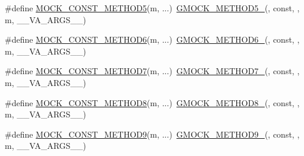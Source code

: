 \begin{DoxyCompactItemize}
\item 
\#define \mbox{\hyperlink{_obj__test_2lib_2googletest-release-1_88_81_2googlemock_2include_2gmock_2gmock-generated-function-mockers_8h_ab7021ec2b869e7c9ea90363ee675f19b}{M\+O\+C\+K\+\_\+\+C\+O\+N\+S\+T\+\_\+\+M\+E\+T\+H\+O\+D5}}(m, ...)~\mbox{\hyperlink{_obj__test_2lib_2googletest-release-1_88_81_2googlemock_2include_2gmock_2gmock-generated-function-mockers_8h_a9e3ecd392499ab19a4a6d3adcabf56f6}{G\+M\+O\+C\+K\+\_\+\+M\+E\+T\+H\+O\+D5\+\_\+}}(, const, , m, \+\_\+\+\_\+\+V\+A\+\_\+\+A\+R\+G\+S\+\_\+\+\_\+)
\item 
\#define \mbox{\hyperlink{_obj__test_2lib_2googletest-release-1_88_81_2googlemock_2include_2gmock_2gmock-generated-function-mockers_8h_a5081a185ba264d599357398952c23af1}{M\+O\+C\+K\+\_\+\+C\+O\+N\+S\+T\+\_\+\+M\+E\+T\+H\+O\+D6}}(m, ...)~\mbox{\hyperlink{_obj__test_2lib_2googletest-release-1_88_81_2googlemock_2include_2gmock_2gmock-generated-function-mockers_8h_ad0ca7f6973a076d0af4c953f8ed91842}{G\+M\+O\+C\+K\+\_\+\+M\+E\+T\+H\+O\+D6\+\_\+}}(, const, , m, \+\_\+\+\_\+\+V\+A\+\_\+\+A\+R\+G\+S\+\_\+\+\_\+)
\item 
\#define \mbox{\hyperlink{_obj__test_2lib_2googletest-release-1_88_81_2googlemock_2include_2gmock_2gmock-generated-function-mockers_8h_a0f0e63ed14beab1d85f0160bdbed9930}{M\+O\+C\+K\+\_\+\+C\+O\+N\+S\+T\+\_\+\+M\+E\+T\+H\+O\+D7}}(m, ...)~\mbox{\hyperlink{_obj__test_2lib_2googletest-release-1_88_81_2googlemock_2include_2gmock_2gmock-generated-function-mockers_8h_ab98a8399ba62b53b375c2807f4d39d2f}{G\+M\+O\+C\+K\+\_\+\+M\+E\+T\+H\+O\+D7\+\_\+}}(, const, , m, \+\_\+\+\_\+\+V\+A\+\_\+\+A\+R\+G\+S\+\_\+\+\_\+)
\item 
\#define \mbox{\hyperlink{_obj__test_2lib_2googletest-release-1_88_81_2googlemock_2include_2gmock_2gmock-generated-function-mockers_8h_a614ee58b7c9ab72e90c850d4bb97a502}{M\+O\+C\+K\+\_\+\+C\+O\+N\+S\+T\+\_\+\+M\+E\+T\+H\+O\+D8}}(m, ...)~\mbox{\hyperlink{_obj__test_2lib_2googletest-release-1_88_81_2googlemock_2include_2gmock_2gmock-generated-function-mockers_8h_aa84a36427c44505207b7cad5dec7ad67}{G\+M\+O\+C\+K\+\_\+\+M\+E\+T\+H\+O\+D8\+\_\+}}(, const, , m, \+\_\+\+\_\+\+V\+A\+\_\+\+A\+R\+G\+S\+\_\+\+\_\+)
\item 
\#define \mbox{\hyperlink{_obj__test_2lib_2googletest-release-1_88_81_2googlemock_2include_2gmock_2gmock-generated-function-mockers_8h_ab7429646bacf56a7d560a3d81d497880}{M\+O\+C\+K\+\_\+\+C\+O\+N\+S\+T\+\_\+\+M\+E\+T\+H\+O\+D9}}(m, ...)~\mbox{\hyperlink{_obj__test_2lib_2googletest-release-1_88_81_2googlemock_2include_2gmock_2gmock-generated-function-mockers_8h_aa820171a19cc587c247dbe05cbffc55f}{G\+M\+O\+C\+K\+\_\+\+M\+E\+T\+H\+O\+D9\+\_\+}}(, const, , m, \+\_\+\+\_\+\+V\+A\+\_\+\+A\+R\+G\+S\+\_\+\+\_\+)

\end{DoxyCompactItemize}
